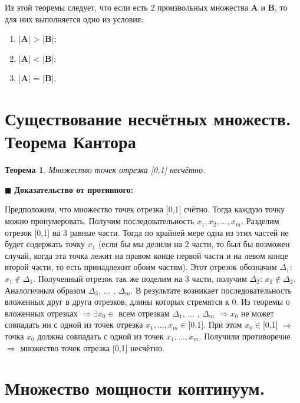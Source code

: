 \documentclass[12pt, a4paper, oneside]{article}
\theoremstyle{plain} %
\newtheorem{theorem}{Теорема}[section]
\theoremstyle{definition}
\begin{document}
Из этой теоремы следует, что если есть 2 произвольных множества \textbf{A} и \textbf{B}, то для них выполняется одно из условия: 

\begin{enumerate}
    
    \item |\textbf{A}| > |\textbf{B}|;
    
    \item |\textbf{A}| < |\textbf{B}|;
    
    \item |\textbf{A}| = |\textbf{B}|.

\end{enumerate}


\section{Существование несчётных множеств. Теорема Кантора}


\begin{theorem} 

Множество точек отрезка [0,1] несчётно.

\end{theorem}

\(\blacksquare\) \textbf{Доказательство от противного:}

Предположим, что множество точек отрезка [0,1] счётно. Тогда каждую точку можно пронумеровать. Получим последовательность $x_1, x_2, ... , x_m$. Разделим отрезок
[0,1] на 3 равные части. Тогда по крайней мере одна из этих частей не будет содержать точку $x_1$ (если бы мы делили на 2 части, то был бы возможен случай, когда эта точка лежит на правом конце первой части и на левом конце второй части, то есть принадлежит обоим частям). Этот отрезок обозначим $\Delta_1$: $x_1 \notin \Delta_1$. Полученный отрезок так же поделим на 3 части, получим $\Delta_2$:  $x_2 \notin \Delta_2$. Аналогичным образом $\Delta_3$, ... , $\Delta_m$. В результате возникает последовательность вложенных друг в друга отрезков, длины которых стремятся к 0. Из теоремы о вложенных отрезках $\Rightarrow \exists x_0 \in$ всем отрезкам $\Delta_1$, ... , $\Delta_m$ $\Rightarrow x_0$ не может совпадать ни с одной из точек отрезка $x_1, ... , x_m \in$[0,1]. При этом $x_0 \in$[0,1] $\Rightarrow$ точка $x_0$ должна совпадать с одной из точек $x_1, ... , x_m$. Получили противоречие $\Rightarrow$ множество точек отрезка [0,1] несчётно.

\section{Множество мощности континуум.}
\end{document}
